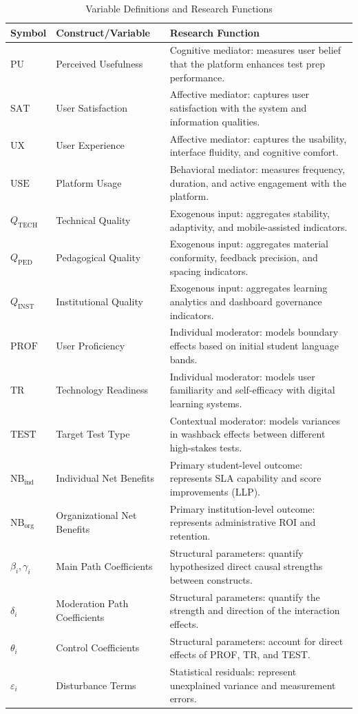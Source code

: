\documentclass[11pt,a4paper]{article}
\begin{document}
\begin{table}[ht]
  \caption{Variable Definitions and Research Functions}
  \label{tab:variables}
  \centering
  \renewcommand{\arraystretch}{1.2}
  \begin{tabular}{@{} L{2.2cm} L{3.5cm} L{8.3cm} @{} }
    \toprule
    \textbf{Symbol} & \textbf{Construct/Variable} & \textbf{Research Function} \\
    \midrule
    $\text{PU}$ & Perceived Usefulness & Cognitive mediator: measures user belief that the platform enhances test prep performance. \\
    $\text{SAT}$ & User Satisfaction & Affective mediator: captures user satisfaction with the system and information qualities. \\
    $\text{UX}$ & User Experience & Affective mediator: captures the usability, interface fluidity, and cognitive comfort. \\
    $\text{USE}$ & Platform Usage & Behavioral mediator: measures frequency, duration, and active engagement with the platform. \\
    $Q_{\text{TECH}}$ & Technical Quality & Exogenous input: aggregates stability, adaptivity, and mobile-assisted indicators. \\
    $Q_{\text{PED}}$ & Pedagogical Quality & Exogenous input: aggregates material conformity, feedback precision, and spacing indicators. \\
    $Q_{\text{INST}}$ & Institutional Quality & Exogenous input: aggregates learning analytics and dashboard governance indicators. \\
    $\text{PROF}$ & User Proficiency & Individual moderator: models boundary effects based on initial student language bands. \\
    $\text{TR}$ & Technology Readiness & Individual moderator: models user familiarity and self-efficacy with digital learning systems. \\
    $\text{TEST}$ & Target Test Type & Contextual moderator: models variances in washback effects between different high-stakes tests. \\
    $\text{NB}_{\text{ind}}$ & Individual Net Benefits & Primary student-level outcome: represents SLA capability and score improvements (LLP). \\
    $\text{NB}_{\text{org}}$ & Organizational Net Benefits & Primary institution-level outcome: represents administrative ROI and retention. \\
    $\beta_i, \gamma_i$ & Main Path Coefficients & Structural parameters: quantify hypothesized direct causal strengths between constructs. \\
    $\delta_i$ & Moderation Path Coefficients & Structural parameters: quantify the strength and direction of the interaction effects. \\
    $\theta_i$ & Control Coefficients & Structural parameters: account for direct effects of PROF, TR, and TEST. \\
    $\varepsilon_i$ & Disturbance Terms & Statistical residuals: represent unexplained variance and measurement errors. \\
    \bottomrule
  \end{tabular}
\end{table}
\end{document}
